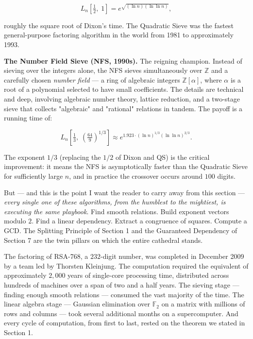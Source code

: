 \documentclass[12pt, letterpaper, openany]{book}
\theoremstyle{definition}
\theoremstyle{remark}
\begin{document}
\[
L_n\!\left[\tfrac{1}{2}, \; 1\right] = e^{\sqrt{(\ln n)(\ln \ln n)}},
\]

roughly the square root of Dixon's time. The Quadratic Sieve was the fastest general-purpose factoring algorithm in the world from 1981 to approximately 1993.

\textbf{The Number Field Sieve (NFS, 1990s).} The reigning champion. Instead of sieving over the integers alone, the NFS sieves simultaneously over $\mathbb{Z}$ and a carefully chosen \textit{number field} --- a ring of algebraic integers $\mathbb{Z}[\alpha]$, where $\alpha$ is a root of a polynomial selected to have small coefficients. The details are technical and deep, involving algebraic number theory, lattice reduction, and a two-stage sieve that collects "algebraic" and "rational" relations in tandem. The payoff is a running time of:

\[
L_n\!\left[\tfrac{1}{3}, \; \left(\tfrac{64}{9}\right)^{\!1/3}\right] \approx e^{1.923 \cdot (\ln n)^{1/3} (\ln \ln n)^{2/3}}.
\]

The exponent $1/3$ (replacing the $1/2$ of Dixon and QS) is the critical improvement: it means the NFS is asymptotically faster than the Quadratic Sieve for sufficiently large $n$, and in practice the crossover occurs around $100$ digits.

But --- and this is the point I want the reader to carry away from this section --- \textit{every single one of these algorithms, from the humblest to the mightiest, is executing the same playbook}. Find smooth relations. Build exponent vectors modulo $2$. Find a linear dependency. Extract a congruence of squares. Compute a GCD. The Splitting Principle of Section 1 and the Guaranteed Dependency of Section 7 are the twin pillars on which the entire cathedral stands.

The factoring of RSA-768, a $232$-digit number, was completed in December 2009 by a team led by Thorsten Kleinjung. The computation required the equivalent of approximately $2{,}000$ years of single-core processing time, distributed across hundreds of machines over a span of two and a half years. The sieving stage --- finding enough smooth relations --- consumed the vast majority of the time. The linear algebra stage --- Gaussian elimination over $\mathbb{F}_2$ on a matrix with millions of rows and columns --- took several additional months on a supercomputer. And every cycle of computation, from first to last, rested on the theorem we stated in Section 1.
\end{document}
